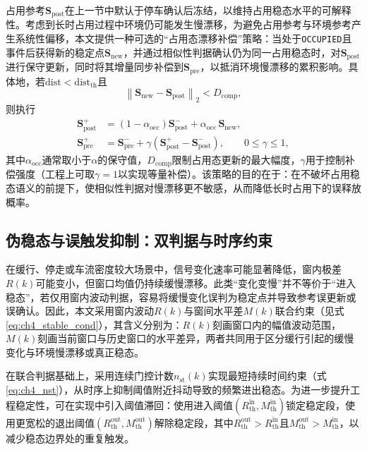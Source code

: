 \documentclass{xdupgthesis}
\begin{document}
占用参考$\mathbf{S}_{\mathrm{post}}$在上一节中默认于停车确认后冻结，以维持占用稳态水平的可解释性。考虑到长时占用过程中环境仍可能发生慢漂移，为避免占用参考与环境参考产生系统性偏移，本文提供一种可选的“占用态漂移补偿”策略：当处于\texttt{OCCUPIED}且事件后获得新的稳定点$\mathbf{S}_{\mathrm{new}}$，并通过相似性判据确认仍为同一占用稳态时，对$\mathbf{S}_{\mathrm{post}}$进行保守更新，同时将其增量同步补偿到$\mathbf{S}_{\mathrm{pre}}$，以抵消环境慢漂移的累积影响。具体地，若$\mathrm{dist}<\mathrm{dist}_{\mathrm{th}}$且
\begin{equation}
\left\lVert \mathbf{S}_{\mathrm{new}}-\mathbf{S}_{\mathrm{post}}\right\rVert_2 < D_{\mathrm{comp}},
\label{eq:ch4_comp_gate}
\end{equation}
则执行
\begin{align}
\mathbf{S}_{\mathrm{post}}^{+} &= (1-\alpha_{\mathrm{occ}})\mathbf{S}_{\mathrm{post}}^{-} + \alpha_{\mathrm{occ}}\,\mathbf{S}_{\mathrm{new}}, \label{eq:ch4_post_update}\\
\mathbf{S}_{\mathrm{pre}}^{+}  &= \mathbf{S}_{\mathrm{pre}}^{-} + \gamma\left(\mathbf{S}_{\mathrm{post}}^{+}-\mathbf{S}_{\mathrm{post}}^{-}\right), \qquad 0\le \gamma \le 1,
\label{eq:ch4_pre_comp}
\end{align}
其中$\alpha_{\mathrm{occ}}$通常取小于$\alpha$的保守值，$D_{\mathrm{comp}}$限制占用态更新的最大幅度，$\gamma$用于控制补偿强度（工程上可取$\gamma=1$以实现等量补偿）。该策略的目的在于：在不破坏占用稳态语义的前提下，使相似性判据对慢漂移更不敏感，从而降低长时占用下的误释放概率。

\subsection{伪稳态与误触发抑制：双判据与时序约束}
\label{subsec:ch4_pseudo}

在缓行、停走或车流密度较大场景中，信号变化速率可能显著降低，窗内极差$R(k)$可能变小，但窗口均值仍持续缓慢漂移。此类“变化变慢”并不等价于“进入稳态”，若仅用窗内波动判据，容易将缓慢变化误判为稳定点并导致参考误更新或误确认。因此，本文采用窗内波动$R(k)$与窗间水平差$M(k)$联合约束（见式\eqref{eq:ch4_stable_cond}），其含义分别为：$R(k)$刻画窗口内的幅值波动范围，$M(k)$刻画当前窗口与历史窗口的水平差异，两者共同用于区分缓行引起的缓慢变化与环境慢漂移或真正稳态。

在联合判据基础上，采用连续门控计数$n_{\mathrm{st}}(k)$实现最短持续时间约束（式\eqref{eq:ch4_nst}），从时序上抑制阈值附近抖动导致的频繁进出稳态。为进一步提升工程稳定性，可在实现中引入阈值滞回：使用进入阈值$(R_{\mathrm{th}}^{\mathrm{in}},M_{\mathrm{th}}^{\mathrm{in}})$锁定稳定段，使用更宽松的退出阈值$(R_{\mathrm{th}}^{\mathrm{out}},M_{\mathrm{th}}^{\mathrm{out}})$解除稳定段，其中$R_{\mathrm{th}}^{\mathrm{out}}>R_{\mathrm{th}}^{\mathrm{in}}$且$M_{\mathrm{th}}^{\mathrm{out}}>M_{\mathrm{th}}^{\mathrm{in}}$，以减少稳态边界处的重复触发。
\end{document}
